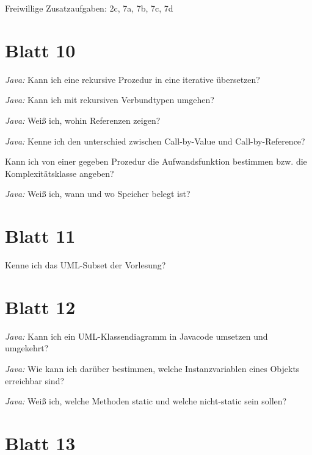 \documentclass{article}
\newcommand*{\thecheckbox}{\hss[\hss]}
\newenvironment*{checklist} 
{\list{}{\itemsep -2pt 
\renewcommand*{\makelabel}[1]{\thecheckbox}}} 
{\endlist}
\begin{document}
Freiwillige Zusatzaufgaben: 2c, 7a, 7b, 7c, 7d

\section{Blatt 10}

\begin{checklist}
  \item \emph{Java:} Kann ich eine rekursive Prozedur in eine iterative übersetzen?
  \item \emph{Java:} Kann ich mit rekursiven Verbundtypen umgehen?
  \item \emph{Java:} Weiß ich, wohin Referenzen zeigen?
  \item \emph{Java:} Kenne ich den unterschied zwischen Call-by-Value und Call-by-Reference?
  \item Kann ich von einer gegeben Prozedur die Aufwandsfunktion bestimmen bzw. die Komplexitätsklasse angeben?
  \item \emph{Java:} Weiß ich, wann und wo Speicher belegt ist?
\end{checklist}

\section{Blatt 11}

\begin{checklist}
  \item Kenne ich das UML-Subset der Vorlesung?
\end{checklist}

\section{Blatt 12}

\begin{checklist}
  \item \emph{Java:} Kann ich ein UML-Klassendiagramm in Javacode umsetzen und umgekehrt?
  \item \emph{Java:} Wie kann ich darüber bestimmen, welche Instanzvariablen eines Objekts erreichbar sind?
  \item \emph{Java:} Weiß ich, welche Methoden static und welche nicht-static sein sollen?
\end{checklist}

\section{Blatt 13}
\end{document}
